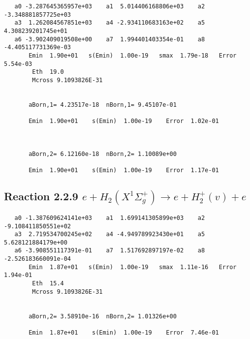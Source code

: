 \documentclass[12pt,dvipdfmx]{article}
\begin{document}
\begin{small}\begin{verbatim}
   a0 -3.287645365957e+03    a1  5.014406168806e+03    a2 -3.348881857725e+03
   a3  1.262084567851e+03    a4 -2.934110683163e+02    a5  4.308239201745e+01
   a6 -3.902409019508e+00    a7  1.994401403354e-01    a8 -4.405117731369e-03
       Emin  1.90e+01   s(Emin)  1.00e-19   smax  1.79e-18   Error  5.54e-03
        Eth  19.0
        Mcross 9.1093826E-31


       aBorn,1= 4.23517e-18  nBorn,1= 9.45107e-01

       Emin  1.90e+01    s(Emin)  1.00e-19    Error  1.02e-01



       aBorn,2= 6.12160e-18  nBorn,2= 1.10089e+00

       Emin  1.90e+01    s(Emin)  1.00e-19    Error  1.17e-01

\end{verbatim}\end{small}




\newpage
\subsection{
Reaction 2.2.9 $e + H_2(X^1\Sigma_g^+) \rightarrow e + H_2^+(v) + e$}
















\begin{small}\begin{verbatim}
   a0 -1.387609624141e+03    a1  1.699141305899e+03    a2 -9.108411850551e+02
   a3  2.719534700245e+02    a4 -4.949789923430e+01    a5  5.628121884179e+00
   a6 -3.908551117391e-01    a7  1.517692897197e-02    a8 -2.526183660091e-04
       Emin  1.87e+01   s(Emin)  1.00e-19   smax  1.11e-16   Error  1.94e-01
        Eth  15.4
        Mcross 9.1093826E-31


       aBorn,2= 3.58910e-16  nBorn,2= 1.01326e+00

       Emin  1.87e+01    s(Emin)  1.00e-19    Error  7.46e-01

\end{verbatim}\end{small}
\end{document}

